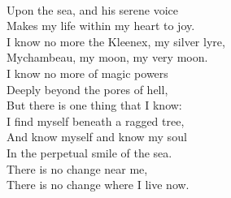 \documentclass[smalldemyvopaper,11pt,twoside,onecolumn,openright,extrafontsizes]{memoir}
\begin{document}
\\Upon the sea, and his serene voice
\\Makes my life within my heart to joy.
\\I know no more the Kleenex, my silver lyre,
\\Mychambeau, my moon, my very moon.
\\I know no more of magic powers
\\Deeply beyond the pores of hell,
\\But there is one thing that I know:
\\I find myself beneath a ragged tree,
\\And know myself and know my soul
\\In the perpetual smile of the sea.
\\There is no change near me,
\\There is no change where I live now.
\end{document}
